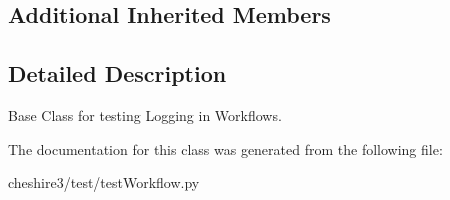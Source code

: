 \subsection*{Additional Inherited Members}


\subsection{Detailed Description}
\begin{DoxyVerb}Base Class for testing Logging in Workflows.\end{DoxyVerb}
 

The documentation for this class was generated from the following file\-:\begin{DoxyCompactItemize}
\item 
cheshire3/test/test\-Workflow.\-py\end{DoxyCompactItemize}
